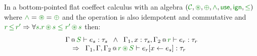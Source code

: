 \begin{lemma*}
In a bottom-pointed flat coeffect calculus with an algebra $(\C, \cseq, \cpar, \czip, \cunit, \czero, \cleq)$ 
where $\czip = \cseq = \cpar$ and the operation is also idempotent and commutative and
$\cclrd{r}\,\cleq\,\cclrd{r'} \Rightarrow \forall\cclrd{s}.\cclrd{r}\,\cseq\,\cclrd{s}\;\cleq\;\cclrd{r'}\,\cseq\,\cclrd{s}$ then:
%
\begin{equation*}
\begin{array}{l}
 \coctx{\Gamma}{\cclrd{S}} \vdash e_s : \tau_s \;\; \wedge \;\; 
 \coctx{\Gamma_1,  x : \tau_s, \Gamma_2}{ \cclrd{r}  } \vdash e_r : \tau_r\\
\quad \Rightarrow \;\; \coctx{\Gamma_1,\Gamma,\Gamma_2}{ \cclrd{r} \,\cseq\, \cclrd{S} } \vdash \subst{e_r}{x}{e_s} : \tau_r
\end{array}
\end{equation*}

\end{lemma*}
